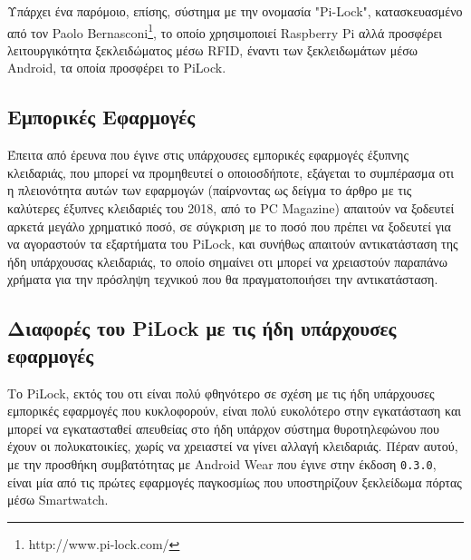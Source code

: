 		Υπάρχει ένα παρόμοιο, επίσης, σύστημα με την ονομασία "Pi-Lock", κατασκευασμένο από τον Paolo Bernasconi\footnote{http://www.pi-lock.com/}, το οποίο χρησιμοποιεί Raspberry Pi αλλά προσφέρει λειτουργικότητα ξεκλειδώματος μέσω RFID, έναντι των ξεκλειδωμάτων μέσω Android, τα οποία προσφέρει το PiLock.

	\subsection{Εμπορικές Εφαρμογές}
		Έπειτα από έρευνα που έγινε στις υπάρχουσες εμπορικές εφαρμογές έξυπνης κλειδαριάς, που μπορεί να προμηθευτεί ο οποιοσδήποτε, εξάγεται το συμπέρασμα οτι η πλειονότητα αυτών των εφαρμογών (παίρνοντας ως δείγμα το άρθρο με τις καλύτερες έξυπνες κλειδαριές του 2018, από το PC Magazine) απαιτούν να ξοδευτεί αρκετά μεγάλο χρηματικό ποσό, σε σύγκριση με το ποσό που πρέπει να ξοδευτεί για να αγοραστούν τα εξαρτήματα του PiLock, και συνήθως απαιτούν αντικατάσταση της ήδη υπάρχουσας κλειδαριάς, το οποίο σημαίνει οτι μπορεί να χρειαστούν παραπάνω χρήματα για την πρόσληψη τεχνικού που θα πραγματοποιήσει την αντικατάσταση.

	\subsection{Διαφορές του PiLock με τις ήδη υπάρχουσες εφαρμογές}
		Το PiLock, εκτός του οτι είναι πολύ φθηνότερο σε σχέση με τις ήδη υπάρχουσες εμπορικές εφαρμογές που κυκλοφορούν, είναι πολύ ευκολότερο στην εγκατάσταση και μπορεί να εγκατασταθεί απευθείας στο ήδη υπάρχον σύστημα θυροτηλεφώνου που έχουν οι πολυκατοικίες, χωρίς να χρειαστεί να γίνει αλλαγή κλειδαριάς. Πέραν αυτού, με την προσθήκη συμβατότητας με Android Wear που έγινε στην έκδοση \verb|0.3.0|, είναι μία από τις πρώτες εφαρμογές παγκοσμίως που υποστηρίζουν ξεκλείδωμα πόρτας μέσω Smartwatch.